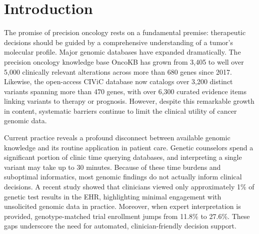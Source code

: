 % 
%
%

\section{Introduction}\label{sec1}

The promise of precision oncology rests on a fundamental premise: therapeutic decisions should be guided by a comprehensive understanding of a tumor's molecular profile. Major genomic databases have expanded dramatically. The precision oncology knowledge base OncoKB has grown from 3,405 to well over 5,000 clinically relevant alterations across more than 680 genes since 2017\cite{bib1}. Likewise, the open-access CIViC database now catalogs over 3,200 distinct variants spanning more than 470 genes, with over 6,300 curated evidence items linking variants to therapy or prognosis\cite{bib2,bib3}. However, despite this remarkable growth in content, systematic barriers continue to limit the clinical utility of cancer genomic data.

Current practice reveals a profound disconnect between available genomic knowledge and its routine application in patient care. Genetic counselors spend a significant portion of clinic time querying databases, and interpreting a single variant may take up to 30 minutes\cite{bib4,bib5}. Because of these time burdens and suboptimal informatics, most genomic findings do not actually inform clinical decisions. A recent study showed that clinicians viewed only approximately 1\% of genetic test results in the EHR, highlighting minimal engagement with unsolicited genomic data in practice\cite{bib6}. Moreover, when expert interpretation is provided, genotype-matched trial enrollment jumps from 11.8\% to 27.6\%\cite{bib7}. These gaps underscore the need for automated, clinician-friendly decision support.

